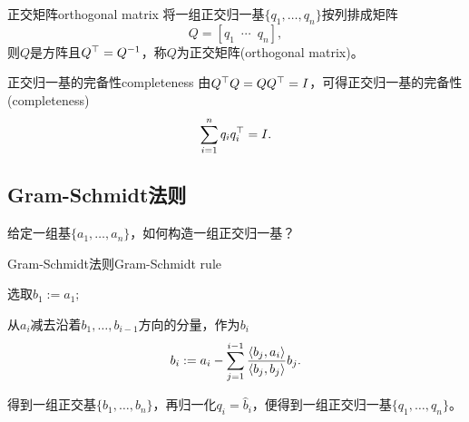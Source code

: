 \begin{definition}
	{正交矩阵}{orthogonal matrix}
	将一组正交归一基$\{q_1,\ldots,q_n\}$按列排成矩阵
	\[
		Q=[q_1\enspace\cdots\enspace q_n],
	\]
	则$Q$是方阵且$Q^\top=Q^{-1}$，称$Q$为正交矩阵(orthogonal matrix)。
\end{definition}
\begin{theorem}
	{正交归一基的完备性}{completeness}
	由$Q^\top Q=QQ^\top=I$，可得正交归一基的完备性(completeness)
	\begin{equation}
		\sum_{i=1}^nq_iq_i^\top=I.
	\end{equation}
\end{theorem}

\subsection{Gram-Schmidt法则}

给定一组基$\{a_1,\ldots,a_n\}$，如何构造一组正交归一基？

\begin{method}{Gram-Schmidt法则}{Gram-Schmidt rule}
	\begin{compactenum}
		\item 选取$b_1:=a_1;$
		\item 从$a_i$减去沿着$b_1,\ldots,b_{i-1}$方向的分量，作为$b_i$
		\[
			b_i:=a_i-\sum_{j=1}^{i-1}\frac{\left\langle b_j,a_i\right\rangle}{\left\langle b_j,b_j\right\rangle}b_j.
		\]
	\end{compactenum}
	得到一组正交基$\{b_1,\ldots,b_n\}$，再归一化$q_i=\hat b_i$，便得到一组正交归一基$\{q_1,\ldots,q_n\}$。
\end{method}


